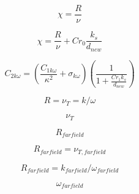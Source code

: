 {\newpage\clearpage
{}%
\begin{displaymath}
\chi =\frac{R}{\nu }
\end{displaymath}%
\lthtmldisplayZ
\lthtmlcheckvsize\clearpage}

{\newpage\clearpage
{}%
\begin{displaymath}
\chi =\frac{R}{\nu} +Cr_{0}\frac{k_{s}}{d_{new}}
\end{displaymath}%
\lthtmldisplayZ
\lthtmlcheckvsize\clearpage}

{\newpage\clearpage
{}%
\begin{displaymath}
C_{2k\omega }=(\frac{C_{1k\omega }}{\kappa ^{2}}+\sigma _{k\omega })(\frac{1}{1+\frac{Cr_{1}k_{s}}{d_{new}}})
\end{displaymath}%
\lthtmldisplayZ
\lthtmlcheckvsize\clearpage}

{\newpage\clearpage
{}%
\begin{displaymath}
R = \nu_T = k/\omega
\end{displaymath}%
\lthtmldisplayZ
\lthtmlcheckvsize\clearpage}

{\newpage\clearpage
{}%
\begin{displaymath}
\nu_T
\end{displaymath}%
\lthtmldisplayZ
\lthtmlcheckvsize\clearpage}

{\newpage\clearpage
{}%
\begin{displaymath}
R_{farfield}
\end{displaymath}%
\lthtmldisplayZ
\lthtmlcheckvsize\clearpage}

{\newpage\clearpage
{}%
\begin{displaymath}
R_{farfield}=\nu_{T,farfield}
\end{displaymath}%
\lthtmldisplayZ
\lthtmlcheckvsize\clearpage}

{\newpage\clearpage
{}%
\begin{displaymath}
R_{farfield}=k_{farfield}/\omega_{farfield}
\end{displaymath}%
\lthtmldisplayZ
\lthtmlcheckvsize\clearpage}

{\newpage\clearpage
{}%
\begin{displaymath}
\omega_{farfield}
\end{displaymath}%
\lthtmldisplayZ
\lthtmlcheckvsize\clearpage}

